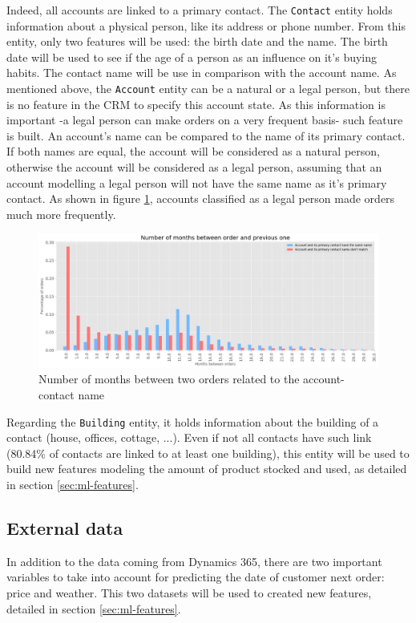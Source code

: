 Indeed, all accounts are linked to a primary contact. The \texttt{Contact} entity holds information about a physical person, like its address or phone number. From this entity, only two features will be used: the birth date and the name. The birth date will be used to see if the age of a person as an influence on it's buying habits. The contact name will be use in comparison with the account name. As mentioned above, the \texttt{Account} entity can be a natural or a legal person, but there is no feature in the CRM to specify this account state. As this information is important -a legal person can make orders on a very frequent basis- such feature is built. An account's name can be compared to the name of its primary contact. If both names are equal, the account will be considered as a natural person, otherwise the account will be considered as a legal person, assuming that an account modelling a legal person will not have the same name as it's primary contact. As shown in figure \ref{fig:account-contact-name-orders}, accounts classified as a legal person made orders much more frequently.

\begin{figure}[h]
    \centering
    \includegraphics[width=15cm]{images/account-contact-name-orders.png}
    \caption{Number of months between two orders related to the account-contact name}
    \label{fig:account-contact-name-orders}
\end{figure}

Regarding the \texttt{Building} entity, it holds information about the building of a contact (house, offices, cottage, ...). Even if not all contacts have such link (80.84\% of contacts are linked to at least one building), this entity will be used to build new features modeling the amount of product stocked and used, as detailed in section \ref{sec:ml-features}.


\subsection{External data}\label{sec:external-data}
In addition to the data coming from Dynamics 365, there are two important variables to take into account for predicting the date of customer next order: price and weather. This two datasets will be used to created new features, detailed in section \ref{sec:ml-features}.

